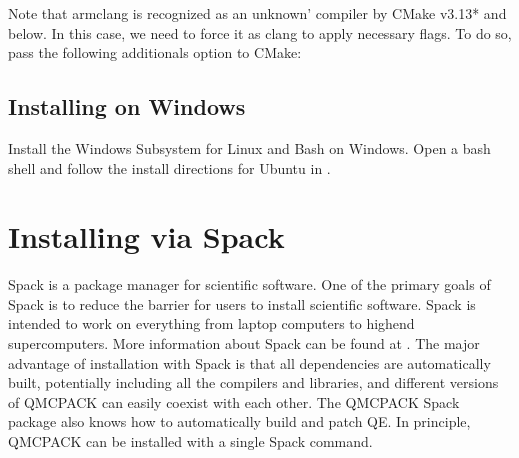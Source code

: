 \documentclass[letterpaper,10pt,english]{sphinxmanual}
\begin{document}
Note that armclang is recognized as an {\color{red}\bfseries{}\textasciigrave{}}unknown’ compiler by CMake v3.13* and below. In this case, we need to force it as clang to apply necessary flags. To do so, pass the following additionals option to CMake:

\begin{sphinxVerbatim}[commandchars=\\\{\}]
  \PYGZbs{}
  \PYGZbs{}
\end{sphinxVerbatim}


\subsection{Installing on Windows}
\label{\detokenize{installation:installing-on-windows}}
Install the Windows Subsystem for Linux and Bash on Windows.
Open a bash shell and follow the install directions for Ubuntu in {\hyperref[\detokenize{installation:buildubuntu}]{}}.


\section{Installing via Spack}
\label{\detokenize{installation:installing-via-spack}}
Spack is a package manager for scientific software.
One of the primary goals of Spack is to reduce the barrier for users to install scientific
software. Spack is intended to work on everything from laptop
computers to high\sphinxhyphen{}end supercomputers. More information about Spack can
be found at . The major
advantage of installation with Spack is that all dependencies are
automatically built, potentially including all the compilers and libraries, and
different versions of QMCPACK can easily coexist with each other.
The QMCPACK Spack package also knows how to automatically build
and patch QE. In principle, QMCPACK can be installed with
a single Spack command.
\end{document}
